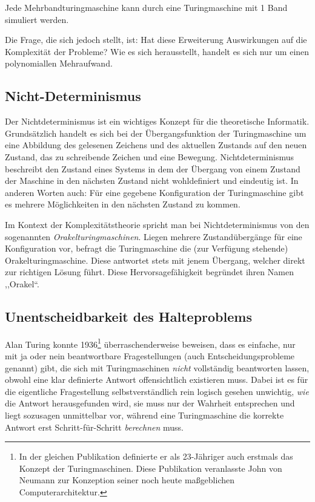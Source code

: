 Jede Mehrbandturingmaschine kann durch eine Turingmaschine mit 1 Band simuliert werden.

Die Frage, die sich jedoch stellt, ist: Hat diese Erweiterung Auswirkungen auf die Komplexität der Probleme? Wie es sich herausstellt, handelt es sich nur um einen polynomiallen Mehraufwand.
%
\subsection{Nicht-Determinismus}
\label{sec:nondeterminism}
%
Der Nichtdeterminismus ist ein wichtiges Konzept für die theoretische Informatik. Grundsätzlich handelt es sich bei der Übergangsfunktion der Turingmaschine um eine Abbildung des gelesenen Zeichens und des aktuellen Zustands auf den neuen Zustand, das zu schreibende Zeichen und eine Bewegung. Nichtdeterminismus beschreibt den Zustand eines Systems in dem der Übergang von einem Zustand der Maschine in den nächsten Zustand nicht wohldefiniert und eindeutig ist. In anderen Worten auch: Für eine gegebene Konfiguration der Turingmaschine gibt es mehrere Möglichkeiten in den nächsten Zustand zu kommen.

Im Kontext der Komplexitätstheorie spricht man bei Nichtdeterminismus von den sogenannten \emph{Orakelturingmaschinen}. Liegen mehrere Zustandübergänge für eine Konfiguration vor, befragt die Turingmaschine die (zur Verfügung stehende) Orakelturingmaschine. Diese antwortet stets mit jenem Übergang, welcher direkt zur richtigen Lösung führt. Diese Hervorsagefähigkeit begründet ihren Namen ,,Orakel``.
%
\subsection{Unentscheidbarkeit des Halteproblems}
%
Alan Turing konnte 1936\footnote{In der gleichen Publikation definierte er als 23-J\"{a}hriger auch erstmals das Konzept der Turingmaschinen. Diese Publikation veranlasste John von Neumann zur Konzeption seiner noch heute ma{\ss}geblichen Computerarchitektur.} \"{u}berraschenderweise beweisen, dass es einfache, nur mit ja oder nein beantwortbare Fragestellungen (auch Entscheidungsprobleme genannt) gibt, die sich mit Turingmaschinen \emph{nicht} vollst\"{a}ndig beantworten lassen, obwohl eine klar definierte Antwort offensichtlich existieren muss. Dabei ist es f\"{u}r die eigentliche Fragestellung selbstverst\"{a}ndlich rein logisch gesehen unwichtig, \emph{wie} die Antwort herausgefunden wird, sie muss nur der Wahrheit entsprechen und liegt sozusagen unmittelbar vor, w\"{a}hrend eine Turingmaschine die korrekte Antwort erst Schritt-f\"{u}r-Schritt \emph{berechnen} muss.

